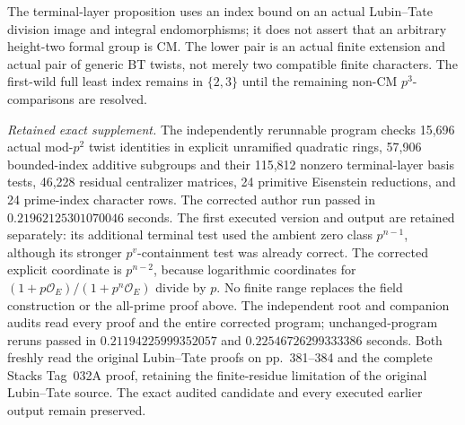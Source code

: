 \begin{remark}
\label{rem:B-RD78-scope}
The terminal-layer proposition uses an index bound on an actual
Lubin--Tate division image and integral endomorphisms; it does
not assert that an arbitrary height-two formal group is CM.
The lower pair is an actual finite extension and actual pair
of generic BT twists, not merely two compatible finite characters.
The first-wild full least index remains in \(\{2,3\}\) until
the remaining non-CM \(p^3\)-comparisons are resolved.


\smallskip
\noindent\emph{Retained exact supplement.}
The independently rerunnable program
checks 15,696 actual mod-\(p^2\) twist identities in explicit
unramified quadratic rings, 57,906 bounded-index additive
subgroups and their 115,812 nonzero terminal-layer basis tests,
46,228 residual centralizer matrices, 24 primitive Eisenstein
reductions, and 24 prime-index character rows.
The corrected author run passed in
\(0.21962125301070046\) seconds.
The first executed version and output are retained separately:
its additional terminal test used the ambient zero class
\(p^{n-1}\), although its stronger \(p^v\)-containment test
was already correct. The corrected explicit coordinate is
\(p^{n-2}\), because logarithmic coordinates for
\((1+p\mathcal O_E)/(1+p^n\mathcal O_E)\) divide by \(p\).
No finite range replaces the field construction or the
all-prime proof above.
The independent root and companion audits read every proof and
the entire corrected program; unchanged-program reruns passed in
\(0.21194225999352057\) and \(0.22546726299333386\) seconds.
Both freshly read the original Lubin--Tate proofs on
pp.~381--384 and the complete Stacks Tag~032A proof, retaining
the finite-residue limitation of the original Lubin--Tate source.
The exact audited candidate and every executed earlier output
remain preserved.
\end{remark}
